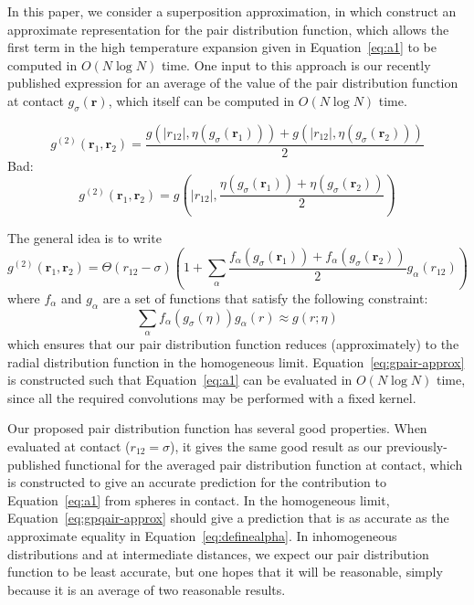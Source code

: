 \documentclass[letterpaper,twocolumn,amsmath,amssymb,pre]{revtex4-1}
\newcommand{\rr}{\textbf{r}}
\begin{document}
In this paper, we consider a superposition approximation, in which
construct an approximate representation for the pair distribution
function, which allows the first term in the high temperature
expansion given in Equation~\ref{eq:a1} to be computed in $O(N\log N)$
time.  One input to this approach is our recently published expression
for an average of the value of the pair distribution function at
contact $g_\sigma(\rr)$, which itself can be computed in $O(N\log N)$
time.

\begin{dmath}
  g^{(2)}(\rr_1,\rr_2) = \frac{g(|r_{12}|, \eta(g_\sigma(\rr_1))) + g(|r_{12}|, \eta(g_\sigma(\rr_2)))}{2}
\end{dmath}
Bad:
\begin{dmath}
  g^{(2)}(\rr_1,\rr_2) = g\left(|r_{12}|, \frac{\eta(g_\sigma(\rr_1)) + \eta(g_\sigma(\rr_2))}{2}\right)
\end{dmath}

The general idea is to write
\begin{dmath}
  g^{(2)}(\rr_1,\rr_2) = \Theta(r_{12}-\sigma)
  \left(1 + \sum_{\alpha} \frac{f_{\alpha}(g_\sigma(\rr_1)) + f_{\alpha}(g_\sigma(\rr_2))}{2}g_{\alpha}(r_{12})\right)\label{eq:gpair-approx}
\end{dmath}
where $f_{\alpha}$ and $g_{\alpha}$ are a set of functions that
satisfy the following constraint:
\begin{dmath}\label{eq:definealpha}
  \sum_{\alpha} f_{\alpha}(g_\sigma(\eta)) g_{\alpha}(r) \approx g(r; \eta)
\end{dmath}
which ensures that our pair distribution function reduces
(approximately) to the radial distribution function in the homogeneous
limit.  Equation~\ref{eq:gpair-approx} is constructed such that
Equation~\ref{eq:a1} can be evaluated in $O(N\log N)$ time, since all
the required convolutions may be performed with a fixed kernel.

Our proposed pair distribution function has several good properties.
When evaluated at contact ($r_{12}=\sigma$), it gives the same good
result as our previously-published functional for the averaged pair
distribution function at contact, which is constructed to give an
accurate prediction for the contribution to Equation~\ref{eq:a1} from
spheres in contact.  In the homogeneous limit,
Equation~\ref{eq:gpqair-approx} should give a prediction that is as
accurate as the approximate equality in
Equation~\ref{eq:definealpha}.  In inhomogeneous distributions and at
intermediate distances, we expect our pair distribution function to be
least accurate, but one hopes that it will be reasonable, simply
because it is an average of two reasonable results.
\end{document}
